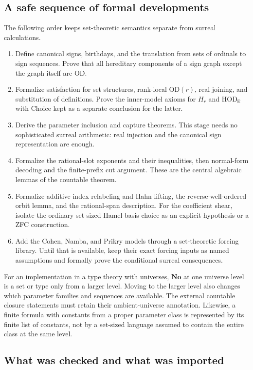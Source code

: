 \documentclass[11pt,a4paper]{article}
\numberwithin{equation}{section}
\theoremstyle{definition}
\theoremstyle{remark}
\newcommand{\No}{\mathbf{No}}
\newcommand{\OD}{\mathrm{OD}}
\newcommand{\HOD}{\mathrm{HOD}}
\newcommand{\R}{\mathbb R}
\newcommand{\HR}{\HOD_{\R}}
\begin{document}
\subsection{A safe sequence of formal developments}

The following order keeps set-theoretic semantics separate from
surreal calculations.

\begin{enumerate}
\item Define canonical signs, birthdays, and the translation from
sets of ordinals to sign sequences. Prove that all hereditary
components of a sign graph except the graph itself are OD.
\item Formalize satisfaction for set structures, rank-local
$\OD(r)$, real joining, and substitution of definitions. Prove the
inner-model axioms for $H_r$ and $\HR$ with Choice kept as a separate
conclusion for the latter.
\item Derive the parameter inclusion and capture theorems. This
stage needs no sophisticated surreal arithmetic: real injection
and the canonical sign representation are enough.
\item Formalize the rational-slot exponents and their inequalities,
then normal-form decoding and the finite-prefix cut argument.
These are the central algebraic lemmas of the countable theorem.
\item Formalize additive index relabeling and Hahn lifting, the
reverse-well-ordered orbit lemma, and the rational-span description.
For the coefficient shear, isolate the ordinary set-sized Hamel-basis
choice as an explicit hypothesis or a ZFC construction.
\item Add the Cohen, Namba, and Prikry models through a set-theoretic
forcing library. Until that is available, keep their exact forcing
inputs as named assumptions and formally prove the conditional
surreal consequences.
\end{enumerate}

For an implementation in a type theory with universes, $\No$ at one
universe level is a set or type only from a larger level. Moving to the
larger level also changes which parameter families and sequences are
available. The external countable closure statements must retain their
ambient-universe annotation. Likewise, a finite formula with constants
from a proper parameter class is represented by its finite list of
constants, not by a set-sized language assumed to contain the entire
class at the same level.

\subsection{What was checked and what was imported}
\end{document}
